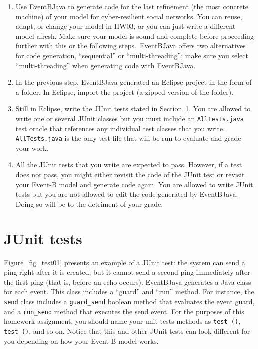 \documentclass{article} %
\newcommand{\eb}{\textsf{Event-B}\xspace}
\newcommand{\ebtj}{\textsf{Event\-B\-2\-Java}\xspace}
\newcommand{\ebcode}[1]{\textsf{#1}}
\begin{document}
\begin{enumerate}[leftmargin=*, label=(\textbf{\roman*}), itemsep=-5pt]
\item Use \ebtj to generate code for the last refinement (the most concrete machine) of your model
  for cyber-resilient social networks. You can reuse, adapt, or change your model in HW03, or you
  can just write a different model afresh. Make sure your model is sound and complete before
  proceeding further with this or the following steps.~\ebtj offers two alternatives for code
  generation, ``sequential'' or ``multi-threading''; make sure you select ``multi-threading'' when
  generating code with \ebtj.
%
\item In the previous step, \ebtj generated an Eclipse project in the form of a folder. In Eclipse,
  import the project (a zipped version of the folder). 
%
\item Still in Eclipse, write the JUnit tests stated in Section~\ref{sec_junit}. You are allowed to write one or several JUnit classes but you must include an \texttt{AllTests.\-java} test oracle that references any individual test classes that you write. \texttt{AllTests.\-java} is the only test file that will be run to evaluate and grade your work.
%  
\item All the JUnit tests that you write are expected to pass. However, if a test does not pass, you might either revisit the code of the JUnit test or revisit your \eb model and generate code again. You are allowed to write JUnit tests but you are not allowed to edit the code generated by \ebtj. Doing so will be to the detriment of your grade.
%
\end{enumerate}
\section{JUnit tests}
\label{sec_junit}

Figure~\ref{fig_test01} presents an example of a JUnit test: the system can send a ping right after it is created, but it cannot send a second ping immediately after the first ping (that is, before an echo occurs). \ebtj generates a Java class for each event. This class includes a ``guard'' and ``run'' method. For instance, the \texttt{send} class includes a \texttt{guard\_send} boolean method that evaluates the event guard, and a \texttt{run\_send} method that executes the \ebcode{send} event. For the purposes of this homework assignment, you should name your unit tests methods as \texttt{test\_()}, \texttt{test\_()}, and so on. Notice that this and other JUnit tests can look different for you depending on how your \eb model works.
\end{document}
